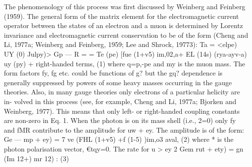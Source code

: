 \documentclass[twoside]{article}
\begin{document}
{{{{{{The phenomenology of this process was first discussed by Weinberg
and Feinberg (1959). The general form of the matrix element for
the electromagnetic current operator between the states of an electron
and a muon is determined by Lorentz invariance and electromagnetic
current conservation to be of the form (Cheng and Li, 1977a; Weinberg and
Feinberg, 1959; Lee and Shrock, 19773):
Ta = <elpe) UY (0) Julpy)>
Gp — R
= = Te (pe) [fue (1+v5) im,02,a+ EL (14s) (rya-ayv-a) uy (py)
+ right-handed terms, (1)
where q=p,-pe and my is the muon mass. The form factors fy, fg etc.
could be functions of g? but the gq? dependence is generally suppressed
by powers of some heavy masses occurring in the gauge theories. Also,
in many gauge theories only electrons of a particular helicity are in-
volved in this process (see, for example, Cheng and Li, 1977a;
Bjorken and Weinberg, 1977). This means that only left- or right-handed
coupling constants are non-zero in Eq. 1. When the photon is on its
mass shell (i.e., 2=0) only fy and fMR contribute to the amplitude
for uw + ey. The amplitude is of the form:
Ge —
mp + ey) = 7 ve (FHL (1+v5) +f (1-5) )im,o3 aval, (2)
where * is the photon polarisation vector, €tqy=0. The rate for u > ey
2
Gem
rut + ety) = gn (Im 12+) mr 12) : (3)

}}}}}}
\end{document}
